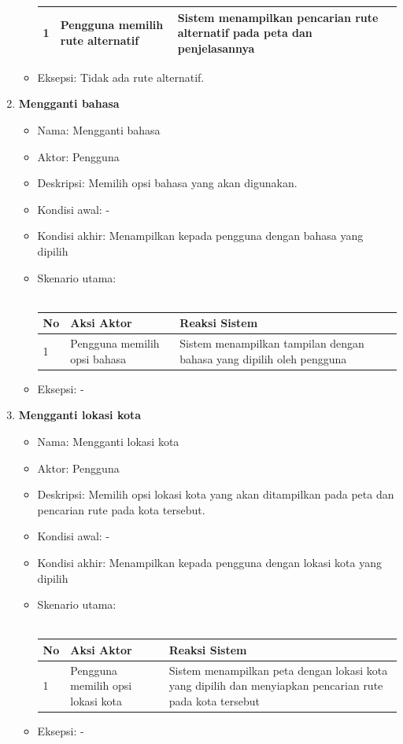 \begin{enumerate}
\begin{itemize}
\begin{tabular}{|p{0.5cm} |p{6cm}| p{6cm}|}
							1 	& Pengguna memilih rute alternatif 	&	Sistem menampilkan pencarian rute alternatif pada peta dan penjelasannya \\ \hline 
						\end{tabular} 
			\item Eksepsi: Tidak ada rute alternatif.
		\end{itemize}
	\item \textbf{Mengganti bahasa}
	\begin{itemize}
			\item Nama: Mengganti bahasa
			\item Aktor: Pengguna
			\item Deskripsi: Memilih opsi bahasa yang akan digunakan.
			\item Kondisi awal: -
			\item Kondisi akhir: Menampilkan kepada pengguna dengan bahasa yang dipilih
			\item Skenario utama: \\ \\
				\begin{tabular}{|p{0.5cm} |p{6cm}| p{6cm}|}
						\hline
							No 	& Aksi Aktor & Reaksi Sistem \\ \hline
							1 	& Pengguna memilih opsi bahasa 	&	Sistem menampilkan tampilan dengan bahasa yang dipilih oleh pengguna \\ \hline 
						\end{tabular} 
			\item Eksepsi: -
		\end{itemize}
	\item \textbf{Mengganti lokasi kota}
	\begin{itemize}
			\item Nama: Mengganti lokasi kota
			\item Aktor: Pengguna
			\item Deskripsi: Memilih opsi lokasi kota yang akan ditampilkan pada peta dan pencarian rute pada kota tersebut.
			\item Kondisi awal: -
			\item Kondisi akhir: Menampilkan kepada pengguna dengan lokasi kota yang dipilih
			\item Skenario utama: \\ \\
				\begin{tabular}{|p{0.5cm} |p{6cm}| p{6cm}|}
						\hline
							No 	& Aksi Aktor & Reaksi Sistem \\ \hline
							1 	& Pengguna memilih opsi lokasi kota 	&	Sistem menampilkan peta dengan lokasi kota yang dipilih dan menyiapkan pencarian rute pada kota tersebut \\ \hline 
						\end{tabular} 
			\item Eksepsi: -
		\end{itemize}
\end{enumerate}


